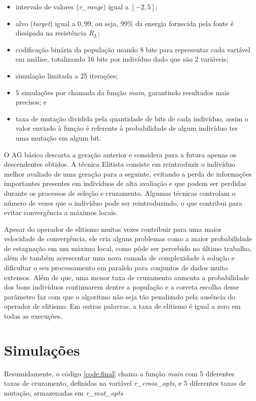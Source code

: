 \documentclass[12pt]{article}
\begin{document}
\begin{itemize}
    \item intervalo de valores (\textit{r\_range}) igual a $\left[-2,5\right]$;
    \item alvo (\textit{target}) igual a $0,99$, ou seja, 99\% da energia fornecida pela fonte é dissipada na resistência $R_L$;
    \item codificação binária da população usando 8 bits para representar cada variável em análise, totalizando 16 bits por indivíduo dado que são 2 variáveis;
    \item simulação limitada a 25 iterações;
    \item 5 simulações por chamada da função \textit{main}, garantindo resultados mais precisos; e
    \item taxa de mutação dividida pela quantidade de bits de cada indivíduo, assim o valor enviado à função é referente à probabilidade de algum indivíduo ter uma mutação em algum bit.
\end{itemize}

\begin{quoting}[rightmargin=0cm,leftmargin=4cm]
\begin{singlespace}
{\footnotesize 
O AG básico descarta a geração anterior e considera para a futura apenas os descendentes obtidos. A técnica Elitista consiste em reintroduzir o indivíduo melhor avaliado de uma geração para a seguinte, evitando a perda de informações importantes presentes em indivíduos de alta avaliação e que podem ser perdidas durante os processos de seleção e cruzamento. Algumas técnicas controlam o número de vezes que o indivíduo pode ser reintroduzindo, o que contribui para evitar convergência a máximos locais. \cite[p. 6]{bento_algoritmos_2008}
}
\end{singlespace}
\end{quoting}

Apesar do operador de elitismo muitas vezes contribuir para uma maior velocidade de convergência, ele cria alguns problemas como a maior probabilidade de estagnação em um máximo local, como pôde ser percebido no último trabalho, além de também acrescentar uma nova camada de complexidade à solução e dificultar o seu processamento em paralelo para conjuntos de dados muito extensos. Além de que, uma menor taxa de cruzamento aumenta a probabilidade dos bons indivíduos continuarem dentre a população e a correta escolha desse parâmetro faz com que o algoritmo não seja tão penalizado pela ausência do operador de elitismo. Em outras palavras, a taxa de elitismo é igual a zero em todas as execuções.

\section{Simulações}



Resumidamente, o código \ref{code:final} chama a função \textit{main} com 5 diferentes taxas de cruzamento, definidas na variável \textit{r\_cross\_opts}, e 5 diferentes taxas de mutação, armazenadas em \textit{r\_mut\_opts}

\clearpage

\end{document}
